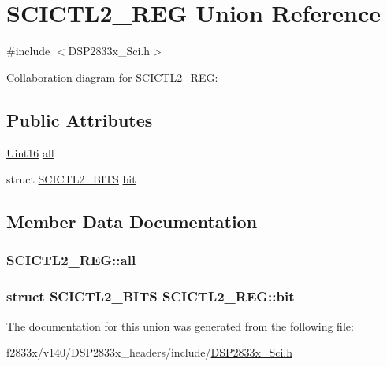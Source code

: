 \hypertarget{union_s_c_i_c_t_l2___r_e_g}{}\section{S\+C\+I\+C\+T\+L2\+\_\+\+R\+E\+G Union Reference}
\label{union_s_c_i_c_t_l2___r_e_g}


{\ttfamily \#include $<$D\+S\+P2833x\+\_\+\+Sci.\+h$>$}



Collaboration diagram for S\+C\+I\+C\+T\+L2\+\_\+\+R\+E\+G\+:
\subsection*{Public Attributes}
\begin{DoxyCompactItemize}
\item 
\hyperlink{_d_s_p2833x___device_8h_a59a9f6be4562c327cbfb4f7e8e18f08b}{Uint16} \hyperlink{union_s_c_i_c_t_l2___r_e_g_a3a7b11e1404c3ce015bfbcfe282a8c51}{all}
\item 
struct \hyperlink{struct_s_c_i_c_t_l2___b_i_t_s}{S\+C\+I\+C\+T\+L2\+\_\+\+B\+I\+T\+S} \hyperlink{union_s_c_i_c_t_l2___r_e_g_afe3da813662a0c730f4be6822dfa09e9}{bit}
\end{DoxyCompactItemize}


\subsection{Member Data Documentation}
\hypertarget{union_s_c_i_c_t_l2___r_e_g_a3a7b11e1404c3ce015bfbcfe282a8c51}{}
\subsubsection[{all}]{ S\+C\+I\+C\+T\+L2\+\_\+\+R\+E\+G\+::all}\label{union_s_c_i_c_t_l2___r_e_g_a3a7b11e1404c3ce015bfbcfe282a8c51}
\hypertarget{union_s_c_i_c_t_l2___r_e_g_afe3da813662a0c730f4be6822dfa09e9}{}
\subsubsection[{bit}]{\setlength{\rightskip}{0pt plus 5cm}struct {\bf S\+C\+I\+C\+T\+L2\+\_\+\+B\+I\+T\+S} S\+C\+I\+C\+T\+L2\+\_\+\+R\+E\+G\+::bit}\label{union_s_c_i_c_t_l2___r_e_g_afe3da813662a0c730f4be6822dfa09e9}


The documentation for this union was generated from the following file\+:\begin{DoxyCompactItemize}
\item 
f2833x/v140/\+D\+S\+P2833x\+\_\+headers/include/\hyperlink{_d_s_p2833x___sci_8h}{D\+S\+P2833x\+\_\+\+Sci.\+h}\end{DoxyCompactItemize}
